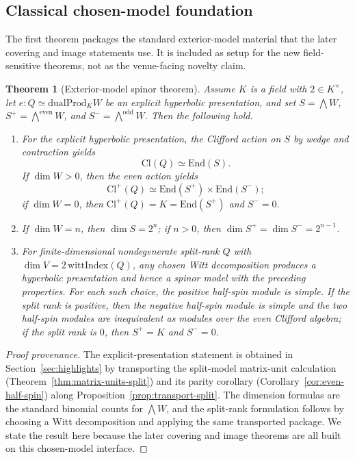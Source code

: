 \documentclass[11pt,a4paper]{article}
\theoremstyle{plain}
\newtheorem{theorem}{Theorem}[section]
\theoremstyle{definition}
\theoremstyle{remark}
\newcommand{\Cl}{\mathrm{Cl}}
\newcommand{\End}{\mathrm{End}}
\newcommand{\dualProd}{\mathrm{dualProd}}
\newcommand{\wedgeEven}{\bigwedge^{\mathrm{even}} W}
\newcommand{\wedgeOdd}{\bigwedge^{\mathrm{odd}} W}
\begin{document}
\subsection*{Classical chosen-model foundation}

The first theorem packages the standard exterior-model material that the later
covering and image statements use. It is included as setup for the new
field-sensitive theorems, not as the venue-facing novelty claim.

\begin{theorem}[Exterior-model spinor theorem]
\label{thm:chosen-spinor-package}
Assume $K$ is a field with $2\in K^\times$, let
$e:Q \simeq \dualProd_K W$ be an explicit hyperbolic presentation, and set
$S=\bigwedge W$, $S^+=\wedgeEven$, and $S^-=\wedgeOdd$. Then the following hold.
\begin{enumerate}
\item For the explicit hyperbolic presentation, the Clifford action on $S$ by
  wedge and contraction yields
  \[
    \Cl(Q)\simeq \End(S).
  \]
  If $\dim W>0$, then the even action yields
  \[
    \Cl^+(Q)\simeq \End(S^+) \times \End(S^-);
  \]
  if $\dim W=0$, then $\Cl^+(Q)=K=\End(S^+)$ and $S^-=0$.
\item If $\dim W=n$, then $\dim S = 2^n$; if $n>0$, then
  $\dim S^+ = \dim S^- = 2^{n-1}$.
\item For finite-dimensional nondegenerate split-rank $Q$ with
  $\dim V = 2\,\mathrm{wittIndex}(Q)$, any chosen Witt decomposition produces a
  hyperbolic presentation and hence a spinor model with the preceding
  properties. For each such choice, the positive half-spin module is simple. If
  the split rank is positive, then the negative half-spin module is simple and
  the two half-spin modules are inequivalent as modules over the even Clifford
  algebra; if the split rank is $0$, then $S^+=K$ and $S^-=0$.
\end{enumerate}
\end{theorem}

\begin{proof}[Proof provenance]
The explicit-presentation statement is obtained in
Section~\ref{sec:highlights} by transporting the split-model matrix-unit
calculation (Theorem~\ref{thm:matrix-units-split}) and its parity corollary
(Corollary~\ref{cor:even-half-spin}) along
Proposition~\ref{prop:transport-split}. The dimension formulas are the standard
binomial counts for $\bigwedge W$, and the split-rank formulation follows by
choosing a Witt decomposition and applying the same transported package. We
state the result here because the later covering and image theorems are all
built on this chosen-model interface.
\end{proof}
\end{document}

